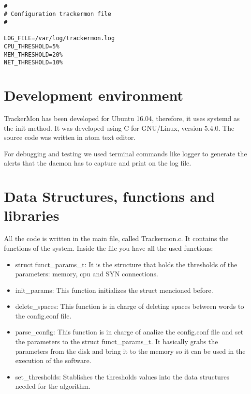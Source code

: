 \documentclass[10pt]{article}
\begin{document}
{\tt \small
\begin{verbatim}
#
# Configuration trackermon file
#

LOG_FILE=/var/log/trackermon.log
CPU_THRESHOLD=5%
MEM_THRESHOLD=20%
NET_THRESHOLD=10%

\end{verbatim}
}

\section{Development environment}

TrackerMon has been developed for Ubuntu 16.04, therefore, it uses systemd as the init method. It was developed using C for GNU/Linux, version 5.4.0.  The source code was written in atom text editor.

For debugging and testing we used terminal commands like logger to generate the alerts that the daemon has to capture and print on the log file.


\section{Data Structures, functions and libraries}

All the code is written in  the main file, called Trackermon.c. It contains the functions of the system. Inside the file you have all the used functions:
\begin{itemize}
    \item struct funct\_params\_t: It is the structure that holds the thresholds of the parameters: memory, cpu and SYN connections.
    \item init\_params: This function initializes the struct mencioned before.
    \item delete\_spaces: This function is in charge of deleting spaces between words to the config.conf file.
    \item parse\_config: This function is in charge of analize the config.conf file and set the parameters to the struct funct\_params\_t. It basically grabs the parameters from the disk and bring it to the memory so it can be used in the execution of the software.
    \item set\_thresholds: Stablishes the thresholds values into the data structures needed for the algorithm.
\end{itemize}
\end{document}
